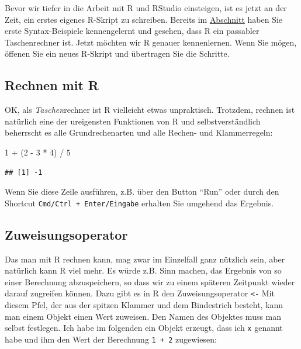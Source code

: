 \documentclass[
]{book}
\newenvironment{Shaded}{\begin{snugshade}}{\end{snugshade}}
\newcommand{\DecValTok}[1]{\textcolor[rgb]{0.00,0.00,0.81}{#1}}
\newcommand{\NormalTok}[1]{#1}
\newcommand{\SpecialCharTok}[1]{\textcolor[rgb]{0.00,0.00,0.00}{#1}}
\begin{document}
Bevor wir tiefer in die Arbeit mit R und RStudio einsteigen, ist es jetzt an der Zeit, ein erstes eigenes R-Skript zu schreiben. Bereits im \protect\hyperlink{konsole}{Abschnitt} haben Sie erste Syntax-Beispiele kennengelernt und gesehen, dass R ein passabler Taschenrechner ist. Jetzt möchten wir R genauer kennenlernen. Wenn Sie mögen, öffenen Sie ein neues R-Skript und übertragen Sie die Schritte.

\hypertarget{rechnen-mit-r}{%
\subsection{Rechnen mit R}\label{rechnen-mit-r}}

OK, als \emph{Taschen}rechner ist R vielleicht etwas unpraktisch. Trotzdem, rechnen ist natürlich eine der ureigensten Funktionen von R und selbstverständlich beherrscht es alle Grundrechenarten und alle Rechen- und Klammerregeln:

\begin{Shaded}
\begin{Highlighting}[]
\DecValTok{1} \SpecialCharTok{+}\NormalTok{ (}\DecValTok{2} \SpecialCharTok{{-}} \DecValTok{3} \SpecialCharTok{*} \DecValTok{4}\NormalTok{) }\SpecialCharTok{/} \DecValTok{5} 
\end{Highlighting}
\end{Shaded}

\begin{verbatim}
## [1] -1
\end{verbatim}

Wenn Sie diese Zeile ausführen, z.B. über den Button ``Run'' oder durch den Shortcut \texttt{Cmd/Ctrl\ +\ Enter/Eingabe} erhalten Sie umgehend das Ergebnis.

\hypertarget{zuweisungsoperator}{%
\subsection{Zuweisungsoperator}\label{zuweisungsoperator}}

Das man mit R rechnen kann, mag zwar im Einzelfall ganz nützlich sein, aber natürlich kann R viel mehr. Es würde z.B. Sinn machen, das Ergebnis von so einer Berechnung abzuspeichern, so dass wir zu einem späteren Zeitpunkt wieder darauf zugreifen können. Dazu gibt es in R den Zuweisungsoperator \texttt{\textless{}-} Mit diesem Pfel, der aus der spitzen Klammer und dem Bindestrich besteht, kann man einem Objekt einen Wert zuweisen. Den Namen des Objektes muss man selbst festlegen. Ich habe im folgenden ein Objekt erzeugt, dass ich \texttt{x} genannt habe und ihm den Wert der Berechnung \texttt{1\ +\ 2} zugewiesen:
\end{document}
